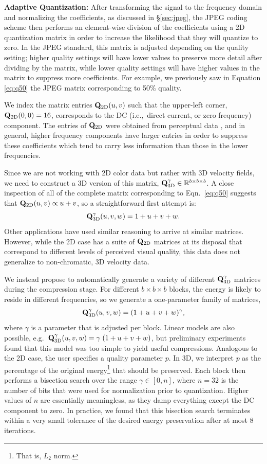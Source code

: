 \noindent \textbf{Adaptive Quantization:} After transforming the signal to the frequency domain and normalizing the coefficients, as discussed in \S\ref{sec:jpeg}, the JPEG coding scheme then performs an element-wise division of the coefficients using a 2D quantization matrix in order to increase the likelihood that they will quantize to zero. In the JPEG standard, this matrix is adjusted depending on the quality setting; higher quality settings will have lower values to preserve more detail after dividing by the matrix, while lower quality settings will have higher values in the matrix to suppress more coefficients. For example, we previously saw in Equation \ref{eq:q50} the JPEG matrix corresponding to 50\% quality.

We index the matrix entries $\mathbf{Q}_{\textrm{2D}}(u,v)$ such that the upper-left corner, $\mathbf{Q}_{\textrm{2D}}(0,0) = 16$, corresponds to the DC (i.e.,~direct current, or zero frequency) component.  The entries of $\mathbf{Q}_{\textrm{2D}}$ were obtained from perceptual data \cite{Sayood:2012:JPEG}, and in general, higher frequency components have larger entries in order to suppress these coefficients which tend to carry less information than those in the lower frequencies.

Since we are not working with 2D color data but rather with 3D velocity fields, we need to construct a 3D version of this matrix, $\mathbf{Q}^{\gamma}_{\textrm{3D}} \in \mathbb{R}^{b \times b \times b}$. A close inspection of all of the complete matrix corresponding to Eqn.~\ref{eq:q50} suggests that $\mathbf{Q}_{\textrm{2D}}(u,v) \propto u + v$, so a straightforward first attempt is:
\begin{equation}
\mathbf{Q}^{\gamma}_{\textrm{3D}}(u,v,w) = 1 + u + v + w.
\end{equation}
Other applications \cite{Yeo:1995:VRD} have used similar reasoning to arrive at similar matrices. However, while the 2D case has a suite of $\mathbf{Q}_{\textrm{2D}}$ matrices at its disposal that correspond to different levels of perceived visual quality, this data does not generalize to non-chromatic, 3D velocity data.

We instead propose to automatically generate a variety of different $\mathbf{Q}^{\gamma}_{\textrm{3D}}$ matrices during the compression stage. For different $b \times b \times b$ blocks, the energy is likely to reside in different frequencies, so we generate a one-parameter family of matrices,
\begin{equation}
\mathbf{Q}^{\gamma}_{\textrm{3D}}(u,v,w) = (1 + u + v + w)^\gamma,
\end{equation}
where $\gamma$ is a parameter that is adjusted per block. Linear models are also possible, e.g.~$\mathbf{Q}^{\gamma}_{\textrm{3D}}(u,v,w) = \gamma\;(1 + u + v + w)$, but preliminary experiments found that this model was too simple to yield useful compressions. Analogous to the 2D case, the user specifies a quality parameter $p$. In 3D, we interpret $p$ as the percentage of the original energy\footnote{That is, $L_2$ norm.} that should be preserved. Each block then performs a bisection search over the range $\gamma \in [0, n]$, where $n = 32$ is the number of bits that were used for normalization prior to quantization. Higher values of $n$ are essentially meaningless, as they damp everything except the DC component to zero. In practice, we found that this bisection search terminates within a very small tolerance of the desired energy preservation after at most $8$ iterations.

